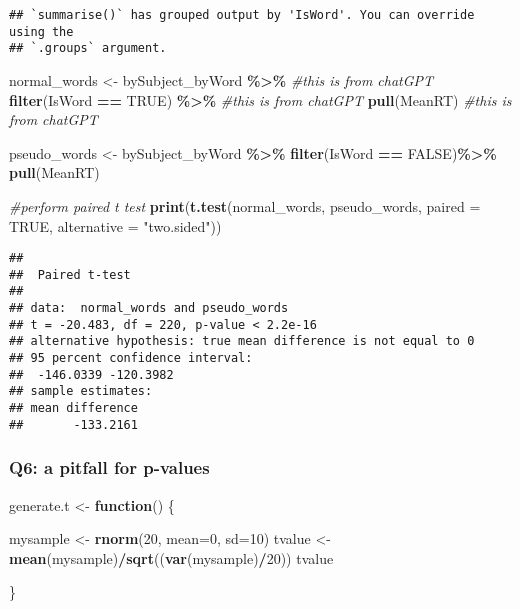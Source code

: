 \documentclass[
]{article}
\newenvironment{Shaded}{\begin{snugshade}}{\end{snugshade}}
\newcommand{\AttributeTok}[1]{\textcolor[rgb]{0.13,0.29,0.53}{#1}}
\newcommand{\CommentTok}[1]{\textcolor[rgb]{0.56,0.35,0.01}{\textit{#1}}}
\newcommand{\ConstantTok}[1]{\textcolor[rgb]{0.56,0.35,0.01}{#1}}
\newcommand{\ControlFlowTok}[1]{\textcolor[rgb]{0.13,0.29,0.53}{\textbf{#1}}}
\newcommand{\DecValTok}[1]{\textcolor[rgb]{0.00,0.00,0.81}{#1}}
\newcommand{\FunctionTok}[1]{\textcolor[rgb]{0.13,0.29,0.53}{\textbf{#1}}}
\newcommand{\NormalTok}[1]{#1}
\newcommand{\OtherTok}[1]{\textcolor[rgb]{0.56,0.35,0.01}{#1}}
\newcommand{\SpecialCharTok}[1]{\textcolor[rgb]{0.81,0.36,0.00}{\textbf{#1}}}
\newcommand{\StringTok}[1]{\textcolor[rgb]{0.31,0.60,0.02}{#1}}
\begin{document}
\begin{verbatim}
## `summarise()` has grouped output by 'IsWord'. You can override using the
## `.groups` argument.
\end{verbatim}

\begin{Shaded}
\begin{Highlighting}[]
\NormalTok{normal\_words }\OtherTok{\textless{}{-}}\NormalTok{ bySubject\_byWord }\SpecialCharTok{\%\textgreater{}\%} \CommentTok{\#this is from chatGPT}
  \FunctionTok{filter}\NormalTok{(IsWord }\SpecialCharTok{==} \ConstantTok{TRUE}\NormalTok{) }\SpecialCharTok{\%\textgreater{}\%} \CommentTok{\#this is from chatGPT}
  \FunctionTok{pull}\NormalTok{(MeanRT) }\CommentTok{\#this is from chatGPT}


\NormalTok{pseudo\_words }\OtherTok{\textless{}{-}}\NormalTok{ bySubject\_byWord }\SpecialCharTok{\%\textgreater{}\%}
  \FunctionTok{filter}\NormalTok{(IsWord }\SpecialCharTok{==} \ConstantTok{FALSE}\NormalTok{)}\SpecialCharTok{\%\textgreater{}\%}
  \FunctionTok{pull}\NormalTok{(MeanRT)}

\CommentTok{\#perform paired t test}
\FunctionTok{print}\NormalTok{(}\FunctionTok{t.test}\NormalTok{(normal\_words, pseudo\_words,  }\AttributeTok{paired =} \ConstantTok{TRUE}\NormalTok{, }\AttributeTok{alternative =} \StringTok{"two.sided"}\NormalTok{))}
\end{Highlighting}
\end{Shaded}

\begin{verbatim}
## 
##  Paired t-test
## 
## data:  normal_words and pseudo_words
## t = -20.483, df = 220, p-value < 2.2e-16
## alternative hypothesis: true mean difference is not equal to 0
## 95 percent confidence interval:
##  -146.0339 -120.3982
## sample estimates:
## mean difference 
##       -133.2161
\end{verbatim}

\hypertarget{q6-a-pitfall-for-p-values}{%
\subsubsection{Q6: a pitfall for
p-values}\label{q6-a-pitfall-for-p-values}}

\begin{Shaded}
\begin{Highlighting}[]
\NormalTok{generate.t }\OtherTok{\textless{}{-}} \ControlFlowTok{function}\NormalTok{() \{}
    
\NormalTok{    mysample }\OtherTok{\textless{}{-}} \FunctionTok{rnorm}\NormalTok{(}\DecValTok{20}\NormalTok{, }\AttributeTok{mean=}\DecValTok{0}\NormalTok{, }\AttributeTok{sd=}\DecValTok{10}\NormalTok{)}
\NormalTok{    tvalue }\OtherTok{\textless{}{-}} \FunctionTok{mean}\NormalTok{(mysample)}\SpecialCharTok{/}\FunctionTok{sqrt}\NormalTok{((}\FunctionTok{var}\NormalTok{(mysample)}\SpecialCharTok{/}\DecValTok{20}\NormalTok{))}
\NormalTok{    tvalue}

\NormalTok{\}}
\end{Highlighting}
\end{Shaded}
\end{document}
